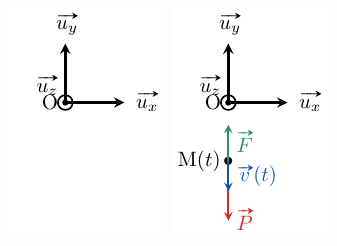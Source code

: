 \documentclass[../../main/main.tex]{subfiles}
\begin{document}
\begin{tcb*}
\begin{isd}[righthand ratio=.3, sidebyside align=top]
\begin{center}
{				\includegraphics[width=.9\linewidth]{cl_fl_stud}
			}{%
				\includegraphics[width=.9\linewidth]{cl_fl_prof}
}
\end{center}
\end{isd}
\end{tcb*}
\end{document}
